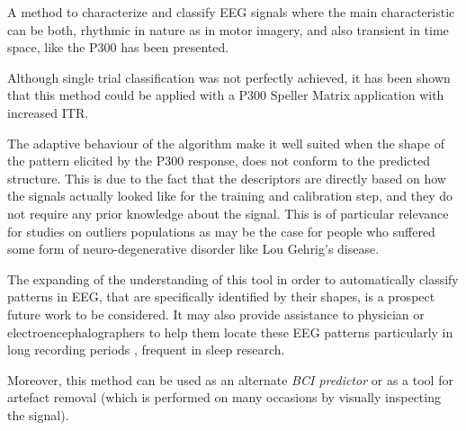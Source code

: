 \documentclass[entropy,article,submit,moreauthors,pdftex,10pt,a4paper]{mdpi}
\begin{document}
A method to characterize and classify EEG signals where the main characteristic can be both, rhythmic in nature as in motor imagery, and also transient in time space, like the P300 has been presented.

Although single trial classification was not perfectly achieved, it has been shown that this method could be applied with a P300 Speller Matrix application with increased ITR.


The adaptive behaviour of the algorithm make it well suited when the shape of the pattern elicited by the P300 response, does not conform to the predicted structure.  This is due to the fact that the descriptors are directly based on how the signals actually looked like for the training and calibration step, and they do not require any prior knowledge about the signal.  This is of particular relevance for studies on outliers populations as may be the case for people who suffered some form of neuro-degenerative disorder like Lou Gehrig's disease.

The expanding of the understanding of this tool in order to automatically classify patterns in EEG, that are specifically identified by their shapes, is a prospect future work to be considered.  It may also provide  assistance to physician or electroencephalographers to help them locate these EEG patterns particularly in long recording periods \citep{Hartman2005}, frequent in sleep research.

Moreover, this method can be used as an alternate \textit{BCI predictor} \citep{Clerc} or as a tool for artefact removal (which is performed on many occasions by visually inspecting the signal).

%
%
%
%
\end{document}
